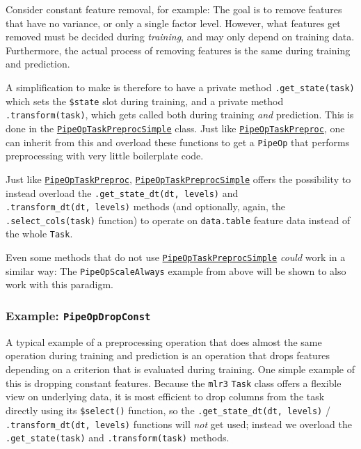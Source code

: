 \documentclass[
]{scrbook}
\begin{document}
Consider constant feature removal, for example: The goal is to remove features that have no variance, or only a single factor level.
However, what features get removed must be decided during \emph{training}, and may only depend on training data.
Furthermore, the actual process of removing features is the same during training and prediction.

A simplification to make is therefore to have a private method \texttt{.get\_state(task)} which sets the \texttt{\$state} slot during training, and a private method \texttt{.transform(task)}, which gets called both during training \emph{and} prediction.
This is done in the \href{https://mlr3pipelines.mlr-org.com/reference/PipeOpTaskPreprocSimple.html}{\texttt{PipeOpTaskPreprocSimple}} class.
Just like \href{https://mlr3pipelines.mlr-org.com/reference/PipeOpTaskPreproc.html}{\texttt{PipeOpTaskPreproc}}, one can inherit from this and overload these functions to get a \texttt{PipeOp} that performs preprocessing with very little boilerplate code.

Just like \href{https://mlr3pipelines.mlr-org.com/reference/PipeOpTaskPreproc.html}{\texttt{PipeOpTaskPreproc}}, \href{https://mlr3pipelines.mlr-org.com/reference/PipeOpTaskPreprocSimple.html}{\texttt{PipeOpTaskPreprocSimple}} offers the possibility to instead overload the \texttt{.get\_state\_dt(dt,\ levels)} and \texttt{.transform\_dt(dt,\ levels)} methods (and optionally, again, the \texttt{.select\_cols(task)} function) to operate on \texttt{data.table} feature data instead of the whole \texttt{Task}.

Even some methods that do not use \href{https://mlr3pipelines.mlr-org.com/reference/PipeOpTaskPreprocSimple.html}{\texttt{PipeOpTaskPreprocSimple}} \emph{could} work in a similar way: The \texttt{PipeOpScaleAlways} example from above will be shown to also work with this paradigm.

\hypertarget{example-pipeopdropconst}{%
\subsubsection{\texorpdfstring{Example: \texttt{PipeOpDropConst}}{Example: PipeOpDropConst}}\label{example-pipeopdropconst}}

A typical example of a preprocessing operation that does almost the same operation during training and prediction is an operation that drops features depending on a criterion that is evaluated during training.
One simple example of this is dropping constant features.
Because the \texttt{mlr3} \texttt{Task} class offers a flexible view on underlying data, it is most efficient to drop columns from the task directly using its \texttt{\$select()} function, so the \texttt{.get\_state\_dt(dt,\ levels)} / \texttt{.transform\_dt(dt,\ levels)} functions will \emph{not} get used; instead we overload the \texttt{.get\_state(task)} and \texttt{.transform(task)} methods.
\end{document}
